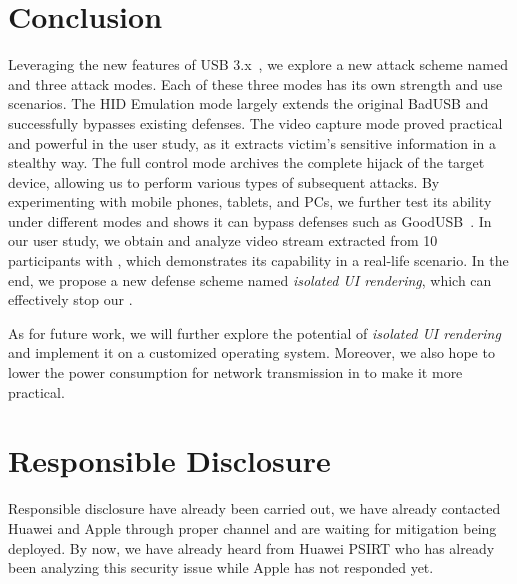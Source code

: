 \section{Conclusion}
\label{sec:conclusion}

Leveraging the new features of USB 3.x~\cite{usb30,usb31,usb32}, we explore a
new attack scheme named \tool and three attack modes. Each of these three modes
has its own strength and use scenarios. The HID Emulation mode largely extends the
original BadUSB and successfully bypasses existing defenses. The video capture mode proved practical and powerful in the user study, as it extracts
victim's sensitive information in a stealthy way. The full control mode
archives the complete hijack of the target device, allowing us to perform various
types of subsequent attacks. By experimenting \tool with mobile phones, tablets,
and PCs, we further test its ability under different modes and shows it can
bypass defenses such as GoodUSB~\cite{tian2015defending}. In our user study, we
obtain and analyze video stream extracted from 10 participants with \tool,
which demonstrates its capability in a real-life scenario. In the end, we
propose a new defense scheme named \textit{isolated UI rendering}, which can
effectively stop our \tool.

As for future work, we will further explore the potential of \textit{isolated UI
rendering} and implement it on a customized operating system. Moreover, we also
hope to lower the power consumption for network transmission in \tool to make
it more practical.

\section{Responsible Disclosure}

Responsible disclosure have already been carried out, we have already contacted Huawei and Apple through proper channel and are waiting for mitigation being deployed. By now, we have already heard from Huawei PSIRT who has already been analyzing this security issue while Apple has not responded yet. 